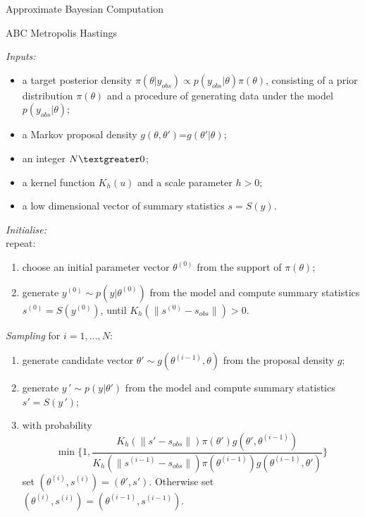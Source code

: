 \documentclass{beamer}
\begin{document}
\begin{section}{Approximate Bayesian Computation}
	
	\begin{frame}[plain]{}
	\sectionpage
\end{frame}

\begin{frame}{ABC Metropolis Hastings}
 {
	\emph{Inputs:}
	\begin{itemize}
		\item a target posterior density $\pi(\theta | y_{obs}) \propto p(y_{obs}|\theta) \pi(\theta)$, consisting of a prior distribution $\pi(\theta)$ and a procedure of generating data under the model $p(y_{obs}|\theta)$;
		\item a Markov proposal density $g(\theta,\theta')$=$g(\theta' | \theta)$;
		\item an integer $N \textgreater0$;
		\item a kernel function $K_h(u)$ and a scale parameter $h > 0$;
		\item a low dimensional vector of summary statistics $s=S(y)$.
	\end{itemize}
	
	\emph{Initialise:} \\
	repeat:
	\begin{enumerate}
		\item choose an initial parameter vector $\theta^{(0)}$ from the support of $\pi(\theta)$;
		\item generate $ y^{(0)} \sim p(y|\theta ^ {(0)})$ from the model and compute summary statistics $s^{(0)}=S(y^{(0)})$, until ${K_h(\parallel s^{(0)}-s_{obs}\parallel)} >0$.
	\end{enumerate}
}
 {
	\emph{Sampling} for $i=1,...,N$:
	\begin{enumerate}
		\item generate candidate vector $\theta' \sim g(\theta^{(i-1)},\theta)$ from the proposal density $g$;
		\item generate $ y\,' \sim p(y|\theta')$ from the model and compute summary statistics  $s' = S(y\,')$;
		\item with probability $$\min \{ 1, \frac{K_h(\parallel s'-s_{obs}\parallel)   \pi(\theta')g(\theta',\theta^{(i-1)})}{K_h(\parallel s^{(i-1)}-s_{obs}\parallel)   \pi(\theta^{(i-1)})g(\theta^{(i-1)},\theta') } \}$$ 
		set $(\theta^{(i)},s^{(i)})=(	\theta',s')$. 
		Otherwise set  $(\theta^{(i)},s^{(i)})=(\theta^{(i-1)},s^{(i-1)})$.
	\end{enumerate}
	
}
\end{frame}
\end{section}
\end{document}
